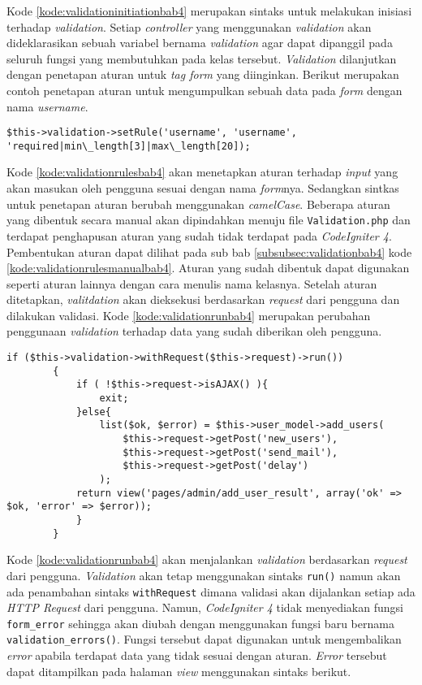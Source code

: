 Kode \ref{kode:validationinitiationbab4} merupakan sintaks untuk melakukan inisiasi terhadap \textit{validation}. Setiap \textit{controller} yang menggunakan \textit{validation} akan dideklarasikan sebuah variabel bernama \textit{validation} agar dapat dipanggil pada seluruh fungsi yang membutuhkan pada kelas tersebut. \textit{Validation} dilanjutkan dengan penetapan aturan untuk \textit{tag form} yang diinginkan. Berikut merupakan contoh penetapan aturan untuk mengumpulkan sebuah data pada \textit{form} dengan nama \textit{username}.

\begin{lstlisting}[caption=Perancangan perubahan konfigurasi aturan pada \textit{library validation}, label=kode:validationrulesbab4]
$this->validation->setRule('username', 'username', 'required|min\_length[3]|max\_length[20]);
\end{lstlisting}

Kode \ref{kode:validationrulesbab4} akan menetapkan aturan terhadap \textit{input} yang akan masukan oleh pengguna sesuai dengan nama \textit{form}nya. Sedangkan sintkas untuk penetapan aturan berubah menggunakan \textit{camelCase}. Beberapa aturan yang dibentuk secara manual akan dipindahkan menuju file \texttt{Validation.php} dan terdapat penghapusan aturan yang sudah tidak terdapat pada \textit{CodeIgniter 4}. Pembentukan aturan dapat dilihat pada sub bab \ref{subsubsec:validationbab4} kode \ref{kode:validationrulesmanualbab4}. Aturan yang sudah dibentuk dapat digunakan seperti aturan lainnya dengan cara menulis nama kelasnya. Setelah aturan ditetapkan, \textit{valitdation} akan dieksekusi berdasarkan \textit{request} dari pengguna dan dilakukan validasi. Kode \ref{kode:validationrunbab4} merupakan perubahan penggunaan \textit{validation} terhadap data yang sudah diberikan oleh pengguna.
\begin{lstlisting}[caption=Perancangan perubahan penggunaan \textit{validation} pada \textit{CodeIgniter 4}, label=kode:validationrunbab4]
if ($this->validation->withRequest($this->request)->run())
		{
			if ( !$this->request->isAJAX() ){
				exit;
			}else{
				list($ok, $error) = $this->user_model->add_users(
					$this->request->getPost('new_users'),
					$this->request->getPost('send_mail'),
					$this->request->getPost('delay')
				);
			return view('pages/admin/add_user_result', array('ok' => $ok, 'error' => $error));
			}
		}
\end{lstlisting}

Kode \ref{kode:validationrunbab4} akan menjalankan \textit{validation} berdasarkan \textit{request} dari pengguna. \textit{Validation} akan tetap menggunakan sintaks \texttt{run()} namun akan ada penambahan sintaks \texttt{withRequest} dimana validasi akan dijalankan setiap ada \textit{HTTP Request} dari pengguna. Namun, \textit{CodeIgniter 4} tidak menyediakan fungsi \texttt{form\_error} sehingga akan diubah dengan menggunakan fungsi baru bernama \texttt{validation\_errors()}. Fungsi tersebut dapat digunakan untuk mengembalikan \textit{error} apabila terdapat data yang tidak sesuai dengan aturan. \textit{Error} tersebut dapat ditampilkan pada halaman \textit{view} menggunakan sintaks berikut.

